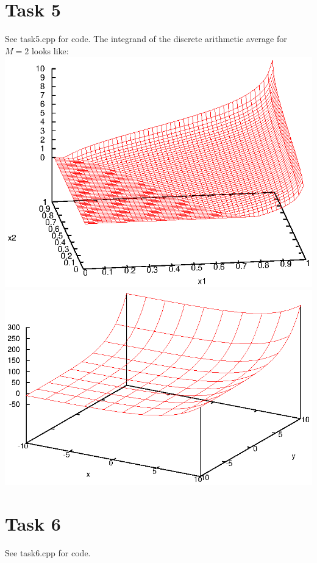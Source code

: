 \documentclass[]{article}
\begin{document}
\section*{Task 5}
See task5.cpp for code. The integrand of the discrete arithmetic average for $M=2$ looks like:\\
\includegraphics{task5_1}\\
\includegraphics{task5_2}\\

\section*{Task 6}
See task6.cpp for code.
\end{document}
